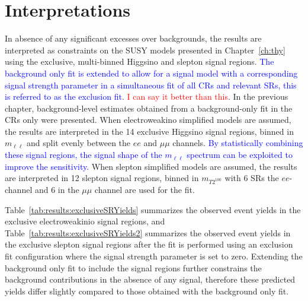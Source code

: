 \chapter{Interpretations}
\label{ch:interpretations}

In absence of any significant excesses over backgrounds, the results are interpreted as constraints on the SUSY models presented in Chapter~\ref{ch:thy} using the exclusive, multi-binned Higgsino and slepton signal regions.  \textcolor{blue}{The background only fit is extended to allow for a signal model with a corresponding signal strength parameter in a simultaneous fit of all CRs and relevant SRs, this is referred to as the exclusion fit}.  \textcolor{red}{I can say it better than this}.  In the previous chapter, background-level estimates obtained from a background-only fit in the CRs only were presented.  When electroweakino simplified models are assumed, the results are interpreted in the 14 exclusive Higgsino signal regions, binned in $m_{\ell\ell}$ and split evenly between the $ee$ and $\mu\mu$ channels.  \textcolor{blue}{By statistically combining these signal regions, the signal shape of the $m_{\ell\ell}$ spectrum can be exploited to improve the sensitivity.} When slepton simplified models are assumed, the results are interpreted in 12 slepton signal regions, binned in $m_{T2^{100}}$ with 6 SRs the $ee$-channel and 6 in the $\mu\mu$ channel are used for the fit.

Table~\ref{tab:results:exclusiveSRYields} summarizes the observed event yields in the exclusive electroweakinio signal regions, and Table~\ref{tab:results:exclusiveSRYields2} summarizes the observed event yields in the exclusive slepton signal regions after the fit is performed using an exclusion fit configuration where the signal strength parameter is set to zero.  Extending the background only fit to include the signal regions further constrains the background contributions in the absence of any signal, therefore these predicted yields differ slightly compared to those obtained with the background only fit.

